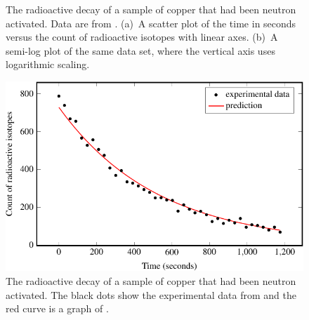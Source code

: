 \documentclass[a4paper,oneside,12pt]{article}
\begin{document}
{\begin{solution}
\begin{figure}[!htbp]
{  \label{subfig:logarithm:copper_decay_log}
}
\caption{%
  The radioactive decay of a sample of copper that had been neutron
  activated.  Data are from
  .  (a)~A scatter plot
  of the time in seconds versus the count of radioactive isotopes with
  linear axes.  (b)~A semi-log plot of the same data set, where the
  vertical axis uses logarithmic scaling.
}
\label{fig:logarithm:copper_decay}
\end{figure}

\begin{table}[!htbp]
\centering

\caption{%
  Detailed calulation of the regression of the data in
  .  The column with the
  heading $x$ lists the elapsed times in seconds.  The column with the
  heading $y$ lists the natural logarithm of the data in the ``Count''
  columns of .  Let
  $\xbar$ and $\ybar$ be the means of the $x$ and $y$ columns,
  respectively.  Then $d(x_i) = x_i - \xbar$ and
  $d(y_i) = y_i - \ybar$.  Most numbers have been rounded to four
  decimal places so as to fit the table.  However, you should not
  round any intermediate results.
}
\label{tab:logarithm:copper_decay_regression}
\end{table}

\begin{figure}[!htbp]
\centering
\includegraphics[scale=1.1]{image/12/copper-decay.pdf}
\caption{%
  The radioactive decay of a sample of copper that had been neutron
  activated.  The black dots show the experimental data from
   and the red curve is
  a graph of .
}
\label{fig:logarithm:copper_decay_data_versus_prediction}
\end{figure}


\end{solution}}
\end{document}
